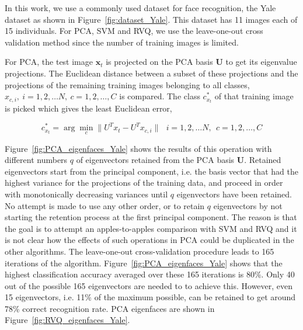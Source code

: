 \begin{Body}
In this work, we use a commonly used dataset for face recognition, the Yale dataset as shown in Figure~\ref{fig:dataset_Yale}.  This dataset has 11 images each of 15 individuals.  For PCA, SVM and RVQ, we use the leave-one-out cross validation method since the number of training images is limited.  

For PCA, the test image $\mathbf{x}_t$ is projected on the PCA basis $\mathbf{U}$ to get its eigenvalue projections.  The Euclidean distance between a subset of these projections and the projections of the remaining training images belonging to all classes, $x_{c,i}, \  i=1, 2, \ldots N, \ c=1, 2, \ldots, C$ is compared.  The class $c^*_{x_t}$ of that training image is picked which gives the least Euclidean error,


\begin{equation}
c^*_{x_t} = \arg\min_c\|U^Tx_t - U^Tx_{c,i}\| \ \ \  i=1, 2, \ldots N, \ \ c=1, 2, \ldots, C
\end{equation}

Figure~\ref{fig:PCA_eigenfaces_Yale} shows the results of this operation with different numbers $q$ of eigenvectors retained from the PCA basis $\mathbf{U}$.  Retained eigenvectors start from the principal component, i.e. the basis vector that had the highest variance for the projections of the training data, and proceed in order with monotonically decreasing variances until $q$ eigenvectors have been retained.  No attempt is made to use any other order, or to retain $q$ eigenvectors by not starting the retention process at the first principal component.  The reason is that the goal is to attempt an apples-to-apples comparison with SVM and RVQ and it is not clear how the effects of such operations in PCA could be duplicated in the other algorithms.  The leave-one-out cross-validation procedure leads to 165 iterations of the algorithm.  Figure~\ref{fig:PCA_eigenfaces_Yale} shows that the highest classification accuracy averaged over these 165 iterations is 80\%.  Only 40 out of the possible 165 eigenvectors are needed to to achieve this.  However, even 15 eigenvectors, i.e. 11\% of the maximum possible, can be retained to get around 78\% correct recognition rate.  PCA eigenfaces are shown in Figure~\ref{fig:RVQ_eigenfaces_Yale}.


\end{Body}
